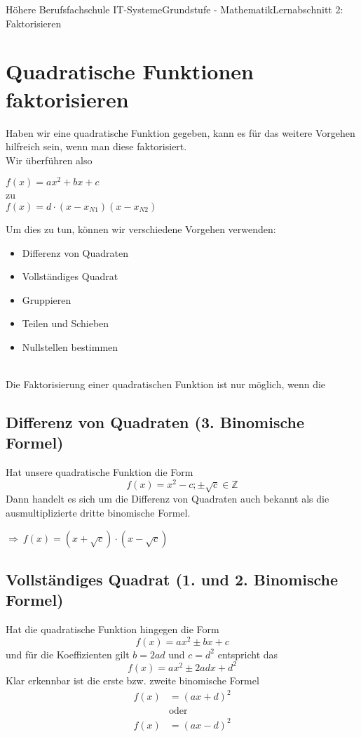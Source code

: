 \documentclass[11pt,twocolumn,oneside,openany,headings=optiontotoc,11pt,numbers=noenddot]{article}
\begin{document}
	\begin{worksheet}{Höhere Berufsfachschule IT-Systeme}{Grundstufe - Mathematik}{Lernabschnitt 2: Faktorisieren}
		\setcounter{section}{1}
		\section{Quadratische Funktionen faktorisieren}
		Haben wir eine quadratische Funktion gegeben, kann es für das weitere Vorgehen hilfreich sein, wenn man diese faktorisiert.\\
		Wir überführen also
		\begin{center}
			\colorbox{red!10}{\(f(x) = ax^2 +bx + c \)}\\
			zu\\
			\colorbox{green!10}{\(f(x) = d\cdot(x - x_{N1})(x-x_{N2})\)}
		\end{center}
		Um dies zu tun, können wir verschiedene Vorgehen verwenden:
		\begin{itemize}
			\item Differenz von Quadraten
			\item Vollständiges Quadrat
			\item Gruppieren
			\item Teilen und Schieben
			\item Nullstellen bestimmen
		\end{itemize}
		\begin{framed}
			\noindent
			\normalcolor\\
			Die Faktorisierung einer quadratischen Funktion ist nur möglich, wenn die 
		\end{framed}
		\subsection{Differenz von Quadraten (3. Binomische Formel)}
		Hat unsere quadratische Funktion die Form \[f(x) = x^2 - c; \pm\sqrt{c}\in \mathbb{Z}\]
		Dann handelt es sich um die Differenz von Quadraten auch bekannt als die ausmultiplizierte dritte binomische Formel.\\
		\par\noindent
		\(\Rightarrow\ f(x) = (x+\sqrt{c})\cdot(x-\sqrt{c})\)
		\subsection{Vollständiges Quadrat (1. und 2. Binomische Formel)}
		Hat die quadratische Funktion hingegen die Form \[f(x) = ax^2 \pm bx + c\] und  für die Koeffizienten gilt \(b = 2ad\) und \(c = d^2\) entspricht das \[f(x) = ax^2 \pm 2adx + d^2\]
		Klar erkennbar ist die erste bzw. zweite binomische Formel
		\begin{align*}
			f(x) & = (ax+d)^2\\
			&\text{oder}\\
			f(x) & = (ax-d)^2
		\end{align*}

\end{worksheet}
\end{document}
